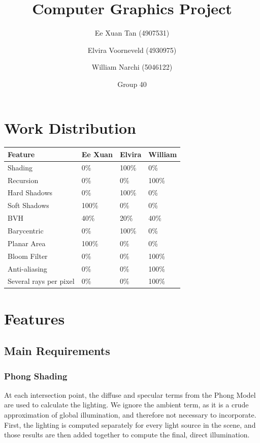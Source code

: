 \documentclass{article}
\author{Ee Xuan Tan (4907531) \and Elvira Voorneveld (4930975) \and William Narchi (5046122)}
\date{Group 40}
\title{Computer Graphics Project}
\begin{document}
    \maketitle

    \section{Work Distribution}
    
    \begin{tabular}{ |p{2.5cm}||p{2.5cm}|p{2.5cm}|p{2.5cm}| }
        \hline
        \textbf{Feature} &\textbf{Ee Xuan} &\textbf{Elvira} &\textbf{William}\\
        \hline
        Shading                        &0\%    &100\%  &0\%\\
        Recursion                      &0\%    &0\%    &100\%\\
        Hard Shadows                   &0\%    &100\%  &0\%\\
        Soft Shadows                   &100\%  &0\%    &0\%\\
        BVH                            &40\%   &20\%   &40\%\\
        Barycentric                    &0\%    &100\%  &0\%\\
        Planar Area                    &100\%  &0\%    &0\%\\
        Bloom Filter                   &0\%    &0\%    &100\%\\
        Anti-aliasing                  &0\%    &0\%    &100\%\\
        Several rays per pixel         &0\%    &0\%    &100\%\\
        \hline
    \end{tabular}

    \section{Features}
    \subsection{Main Requirements}
    \subsubsection{Phong Shading}
    At each intersection point, the diffuse and specular terms from the Phong Model are used to calculate the 
    lighting. We ignore the ambient term, as it is a crude approximation of global illumination, and therefore 
    not necessary to incorporate. First, the lighting is computed separately for every light source in the 
    scene, and those results are then added together to compute the final, direct illumination.
\end{document}
